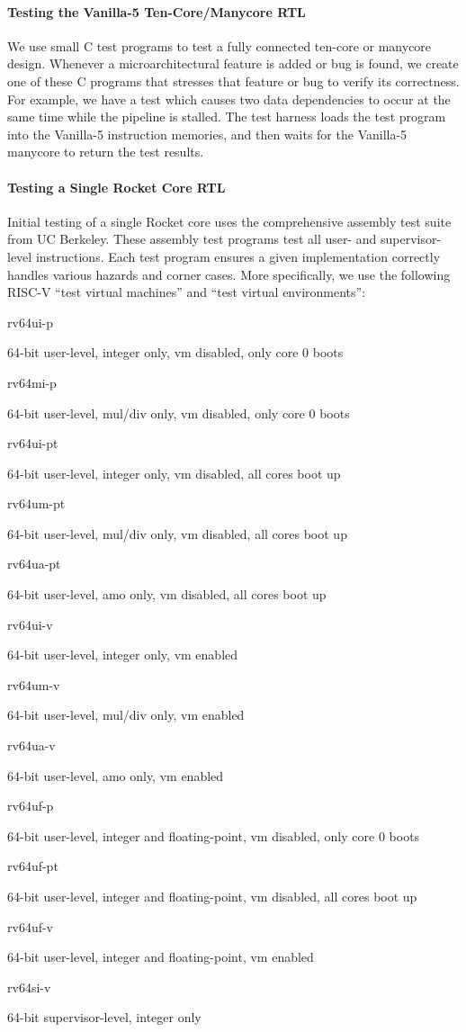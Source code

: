 \paragraph{Testing the Vanilla-5 Ten-Core/Manycore RTL}
We use small C test programs to test a fully connected ten-core or
manycore design. Whenever a microarchitectural feature is added or bug is
found, we create one of these C programs that stresses that feature or
bug to verify its correctness. For example, we have a test which causes
two data dependencies to occur at the same time while the pipeline is
stalled. The test harness loads the test program into the Vanilla-5
instruction memories, and then waits for the Vanilla-5 manycore to return
the test results.

\paragraph{Testing a Single Rocket Core RTL}
Initial testing of a single Rocket core uses the comprehensive assembly
test suite from UC Berkeley. These assembly test programs test all user-
and supervisor-level instructions. Each test program ensures a given
implementation correctly handles various hazards and corner cases. More
specifically, we use the following RISC-V ``test virtual machines'' and
``test virtual environments'':

\smallskip
\begin{cbxlist}{1.5em}{0em}{0em}
  \item \parbox{0.7in}{rv64ui-p}  64-bit user-level, integer only, vm disabled, only core 0 boots
  \item \parbox{0.7in}{rv64mi-p}  64-bit user-level, mul/div only, vm disabled, only core 0 boots
  \item \parbox{0.7in}{rv64ui-pt} 64-bit user-level, integer only, vm disabled, all cores boot up
  \item \parbox{0.7in}{rv64um-pt} 64-bit user-level, mul/div only, vm disabled, all cores boot up
  \item \parbox{0.7in}{rv64ua-pt} 64-bit user-level, amo only, vm disabled, all cores boot up
  \item \parbox{0.7in}{rv64ui-v}  64-bit user-level, integer only, vm enabled
  \item \parbox{0.7in}{rv64um-v}  64-bit user-level, mul/div only, vm enabled
  \item \parbox{0.7in}{rv64ua-v}  64-bit user-level, amo only, vm enabled
  \item \parbox{0.7in}{rv64uf-p}  64-bit user-level, integer and floating-point, vm disabled, only core 0 boots
  \item \parbox{0.7in}{rv64uf-pt} 64-bit user-level, integer and floating-point, vm disabled, all cores boot up
  \item \parbox{0.7in}{rv64uf-v}  64-bit user-level, integer and floating-point, vm enabled
  \item \parbox{0.7in}{rv64si-v}  64-bit supervisor-level, integer only
\end{cbxlist}
\smallskip

